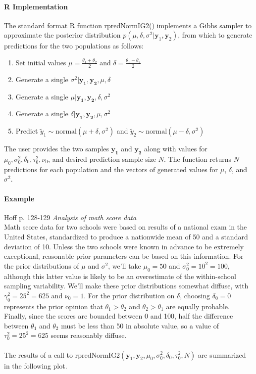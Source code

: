 \documentclass[12pt, a4paper]{article}
\begin{document}
      \paragraph{R Implementation}

      The standard format R function rpredNormIG2() implements a Gibbs sampler to approximate the posterior distribution $p\left(\mu,\delta,\sigma^2|\mathbf{y}_1,\mathbf{y}_2\right)$, from which to generate predictions for the two populations as follows:
      \begin{enumerate}
        \item Set initial values $\mu = \frac{\theta_1 + \theta_2}{2}$ and $\delta = \frac{\theta_1 - \theta_2}{2}$
        \item Generate a single $\sigma^2|\mathbf{y_1},\mathbf{y_2},\mu,\delta$
        \item Generate a single $\mu|\mathbf{y_1},\mathbf{y_2},\delta,\sigma^2$
        \item Generate a single $\delta|\mathbf{y_1},\mathbf{y_2},\mu,\sigma^2$
        \item Predict $\tilde{y}_1\sim \text{normal}\left(\mu+\delta,\sigma^2\right)$ and $\tilde{y}_2\sim \text{normal}\left(\mu-\delta,\sigma^2\right)$
      \end{enumerate}

      The user provides the two samples $\mathbf{y_1}$ and $\mathbf{y_2}$ along with values for $\mu_0, \sigma^2_0, \delta_0, \tau^2_0, \nu_0$, and desired prediction sample size $N$.  The function returns $N$ predictions for each population and the vectors of generated values for $\mu$, $\delta$, and $\sigma^2$.

      \paragraph{Example}

      Hoff p. 128-129 \textit{Analysis of math score data}\\
      Math score data for two schools were based on results of a national exam in the United States, standardized to produce a nationwide mean of 50 and a standard deviation of 10.  Unless the two schools were known in advance to be extremely exceptional, reasonable prior parameters can be based on this information.  For the prior distributions of $\mu$ and $\sigma^2$, we'll take $\mu_0 = 50$ and $\sigma^2_0 = 10^2 = 100$, although this latter value is likely to be an overestimate of the within-school sampling variability.  We'll make these prior distributions somewhat diffuse, with $\gamma^2_0 = 25^2 = 625$ and $\nu_0 = 1$.  For the prior distribution on $\delta$, choosing $\delta_0 = 0$ represents the prior opinion that $\theta_1 > \theta_2$ and $\theta_2 > \theta_1$ are equally probable.  Finally, since the scores are bounded between 0 and 100, half the difference between $\theta_1$ and $\theta_2$ must be less than 50 in absolute value, so a value of $\tau^2_0 = 25^2 = 625$ seems reasonably diffuse.\\\\
      The results of a call to rpredNormIG2$\left(\mathbf{y}_1,\mathbf{y}_2,\mu_0,\sigma^2_0,\delta_0,\tau^2_0,N\right)$ are summarized in the following plot.\\
\end{document}

